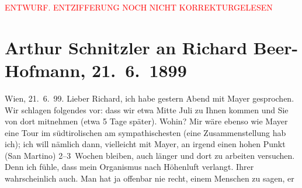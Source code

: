 
\begin{center}
            \textcolor{red}{ENTWURF. ENTZIFFERUNG NOCH NICHT KORREKTURGELESEN}
                      \end{center}
            
               \section[Arthur Schnitzler an Richard Beer-Hofmann, 21. 6. 1899]{ Arthur Schnitzler an Richard Beer-Hofmann, 21. 6. 1899}\nopagebreak{}\rehead{ }\begin{ledgroupsized}[t]{13cm}\normalsize\beginnumbering{} \toendnotes[C]{\smallbreak\pagebreak[2]} 
\toendnotes[C]{\smallbreak}\pstart
           \raggedleft{}{\pb}Wien, 21. 6. 99.\pend
           \pstart
           Lieber Richard, ich habe gestern Abend mit Mayer gesprochen. Wir schlagen folgendes vor: dass wir etwa
                  Mitte Juli zu Ihnen kommen und Sie von dort mitnehmen (etwa 5 Tage
               später). Wohin? Mir wäre ebenso wie Mayer eine
               Tour im südtirolischen am sympathischesten (eine
               Zusammenstellung hab ich); ich will nämlich dann, vielleicht mit Mayer, an irgend einen hohen Punkt (San Martino) 2–3 Wochen bleiben, auch länger und dort zu
               arbeiten versuchen. Denn ich fühle, dass mein Organismus nach Höhenluft verlangt.
               Ihrer wahrscheinlich auch. Man hat ja offenbar nie recht, einem Menschen zu sagen, er

\end{ledgroupsized}
